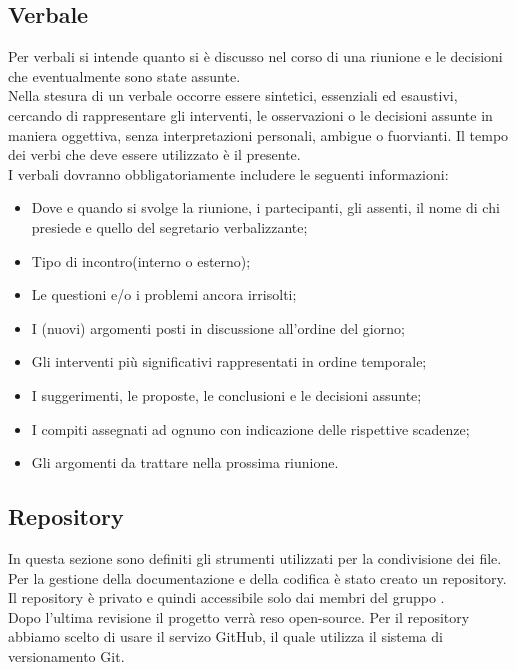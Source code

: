	\subsection{Verbale}
Per verbali si intende quanto si è discusso nel corso di una riunione e le decisioni che eventualmente sono state assunte. \\
Nella stesura di un \gls{verbale} occorre essere sintetici, essenziali ed esaustivi, cercando di rappresentare gli interventi, le osservazioni o le decisioni assunte in maniera oggettiva, senza interpretazioni personali, ambigue o fuorvianti. Il tempo dei verbi che deve essere utilizzato è il presente.\\
I verbali dovranno obbligatoriamente includere le seguenti informazioni:
\begin{itemize}
	\item Dove e quando si svolge la riunione, i partecipanti, gli assenti, il nome di chi presiede e quello del segretario verbalizzante;
	\item Tipo di incontro(interno o esterno);
	\item Le questioni e/o i problemi ancora irrisolti;
	\item I (nuovi) argomenti posti in discussione all'ordine del giorno;
	\item Gli interventi più significativi rappresentati in ordine temporale; 
	\item I suggerimenti, le proposte, le conclusioni e le decisioni assunte; 
	\item I compiti assegnati ad ognuno con indicazione delle rispettive scadenze; 
	\item Gli argomenti da trattare nella prossima riunione. 
\end{itemize}

	\subsection{Repository}\label{repository}
In questa sezione sono definiti gli strumenti utilizzati per la condivisione dei file. \\
Per la gestione della documentazione e della codifica è stato creato un \gls{repository}. Il \gls{repository} è privato e quindi accessibile solo dai membri del gruppo \GRUPPO.\\
Dopo l'ultima revisione il progetto verrà reso open-source.
Per il \gls{repository} abbiamo scelto di usare il servizo \gls{GitHub}, il quale utilizza il sistema di \gls{versionamento} \gls{Git}.

